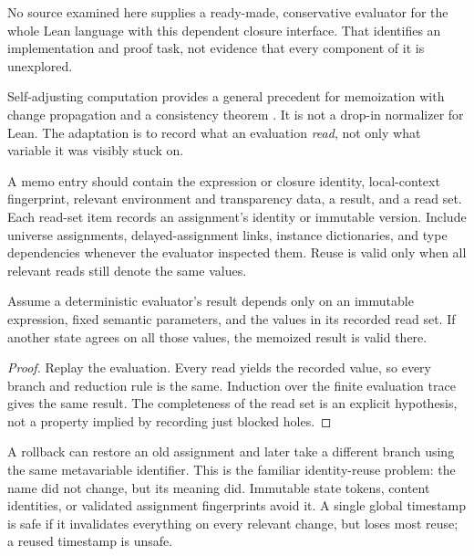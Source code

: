 No source examined here supplies a ready-made, conservative evaluator for the
whole Lean language with this dependent closure interface. That identifies
an implementation and proof task, not evidence that every component of it is
unexplored.


Self-adjusting computation provides a general precedent for memoization with
change propagation and a consistency theorem \cite{selfadjust}. It is not a
drop-in normalizer for Lean. The adaptation is to record what an evaluation
\emph{read}, not only what variable it was visibly stuck on.

A memo entry should contain the expression or closure identity, local-context
fingerprint, relevant environment and transparency data, a result, and a read
set. Each read-set item records an assignment's identity or immutable version.
Include universe assignments, delayed-assignment links, instance dictionaries,
and type dependencies whenever the evaluator inspected them. Reuse is valid
only when all relevant reads still denote the same values.

\begin{proposition}\label{prop:cache}
Assume a deterministic evaluator's result depends only on an immutable
expression, fixed semantic parameters, and the values in its recorded read
set. If another state agrees on all those values, the memoized result is valid
there.
\end{proposition}
\begin{proof}
Replay the evaluation. Every read yields the recorded value, so every branch
and reduction rule is the same. Induction over the finite evaluation trace
gives the same result. The completeness of the read set is an explicit
hypothesis, not a property implied by recording just blocked holes.
\end{proof}

A rollback can restore an old assignment and later take a different branch
using the same metavariable identifier. This is the familiar identity-reuse
problem: the name did not change, but its meaning did. Immutable state tokens,
content identities, or validated assignment fingerprints avoid it. A single
global timestamp is safe if it invalidates everything on every relevant change,
but loses most reuse; a reused timestamp is unsafe.

